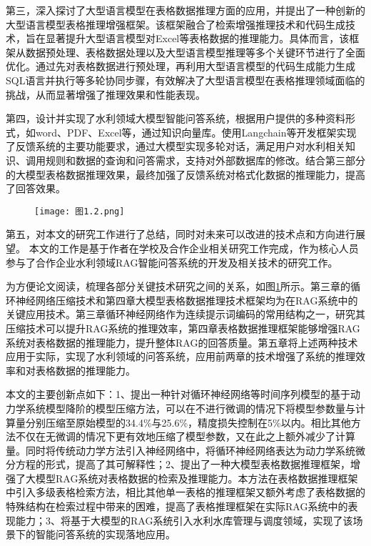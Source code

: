 第三，深入探讨了大型语言模型在表格数据推理方面的应用，并提出了一种创新的大型语言模型表格推理增强框架。该框架融合了检索增强推理技术和代码生成技术，旨在显著提升大型语言模型对Excel等表格数据的推理能力。具体而言，该框架从数据预处理、表格数据处理以及大型语言模型推理等多个关键环节进行了全面优化。通过先对表格数据进行预处理，再利用大型语言模型的代码生成能力生成SQL语言并执行等多轮协同步骤，有效解决了大型语言模型在表格推理领域面临的挑战，从而显著增强了推理效果和性能表现。

第四，设计并实现了水利领域大模型智能问答系统，根据用户提供的多种资料形式，如word、PDF、Excel等，通过知识向量库。使用Langchain等开发框架实现了反馈系统的主要功能要求，通过大模型实现多轮对话，满足用户对水利相关知识、调用规则和数据的查询和问答需求，支持对外部数据库的修改。结合第三部分的大模型表格数据推理效果，最终加强了反馈系统对格式化数据的推理能力，提高了回答效果。
\begin{figure}[!h]
  \centering
  \texttt{[image: 图1.2.png]}
  \label{fig:章节架构}
\end{figure}

第五，对本文的研究工作进行了总结，同时对未来可以改进的技术点和方向进行展望。
本文的工作是基于作者在学校及合作企业相关研究工作完成，作为核心人员参与了合作企业水利领域RAG智能问答系统的开发及相关技术的研究工作。

为方便论文阅读，梳理各部分关键技术研究之间的关系，如图\ref{fig:章节架构}所示。第三章的循环神经网络压缩技术和第四章大模型表格数据推理技术框架均为在RAG系统中的关键应用技术。第三章循环神经网络作为连续提示词编码的常用结构之一，研究其压缩技术可以提升RAG系统的推理效率，第四章表格数据推理框架能够增强RAG系统对表格数据的推理能力，提升整体RAG的回答质量。第五章将上述两种技术应用于实际，实现了水利领域的问答系统，应用前两章的技术增强了系统的推理效率和对表格数据的推理能力。

本文的主要创新点如下：1、提出一种针对循环神经网络等时间序列模型的基于动力学系统模型降阶的模型压缩方法，可以在不进行微调的情况下将模型参数量与计算量分别压缩至原始模型的34.4\%与25.6\%，精度损失控制在5\%以内。相比其他方法不仅在无微调的情况下更有效地压缩了模型参数，又在此之上额外减少了计算量。同时将传统动力学方法引入神经网络中，将循环神经网络表达为动力学系统微分方程的形式，提高了其可解释性；2、提出了一种大模型表格数据推理框架，增强了大模型RAG系统对表格数据的检索及推理能力。本方法在表格数据推理框架中引入多级表格检索方法，相比其他单一表格的推理框架又额外考虑了表格数据的特殊结构在检索过程中带来的困难，提高了表格推理框架在实际RAG系统中的表现能力；3、将基于大模型的RAG系统引入水利水库管理与调度领域，实现了该场景下的智能问答系统的实现落地应用。
\label{sec:first}












